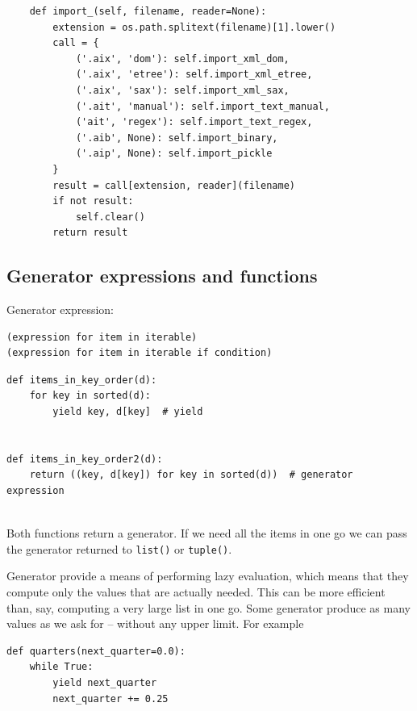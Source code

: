 \begin{lstlisting}
    def import_(self, filename, reader=None):
        extension = os.path.splitext(filename)[1].lower()
        call = {
            ('.aix', 'dom'): self.import_xml_dom,
            ('.aix', 'etree'): self.import_xml_etree,
            ('.aix', 'sax'): self.import_xml_sax,
            ('.ait', 'manual'): self.import_text_manual,
            ('ait', 'regex'): self.import_text_regex,
            ('.aib', None): self.import_binary,
            ('.aip', None): self.import_pickle
        }
        result = call[extension, reader](filename)
        if not result:
            self.clear()
        return result  
\end{lstlisting}


\subsection{Generator expressions and functions}

Generator expression:
\begin{tcolorbox}
\begin{verbatim}
(expression for item in iterable)
(expression for item in iterable if condition)
\end{verbatim}
\end{tcolorbox}

\begin{lstlisting}
def items_in_key_order(d):
    for key in sorted(d):
        yield key, d[key]  # yield


def items_in_key_order2(d):
    return ((key, d[key]) for key in sorted(d))  # generator expression
  
\end{lstlisting}

Both functions return a generator.
If we need all the items in one go
we can pass the generator returned to \verb|list()| or \verb|tuple()|.



Generator provide a means of performing lazy evaluation,
which means that they compute only the values that are actually needed.
This can be more efficient than, say, computing a very large list in one go.
Some generator produce as many values as we ask for -- without any upper limit.
For example
\begin{lstlisting}
def quarters(next_quarter=0.0):
    while True:
        yield next_quarter
        next_quarter += 0.25
\end{lstlisting}

